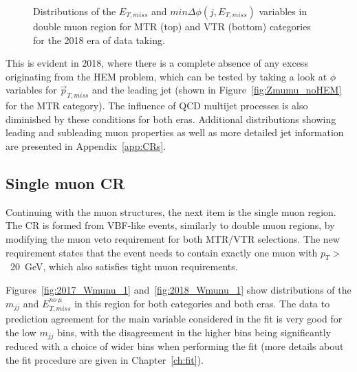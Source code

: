 \begin{figure}[htbp]
{    }
  \caption{Distributions of the $E_{T,miss}$ and $min\Delta\phi(j,E_{T,miss})$ variables in double muon region for MTR (top) and VTR (bottom) categories for the 2018 era of data taking.}
  \label{fig:2018_Zmumu_2}
\end{figure}
\hspace{10pt} This is evident in 2018, where there is a complete absence of any excess originating from the HEM problem, which can be tested by taking a look at $\phi$ variables for $\vec{p}_{T, miss}$ and the leading jet (shown in Figure~\ref{fig:Zmumu_noHEM} for the MTR category). The influence of QCD multijet processes is also diminished by these conditions for both eras. Additional distributions showing leading and subleading muon properties as well as more detailed jet information are presented in Appendix~\ref{app:CRs}.

\subsection{Single muon CR}
\label{sec:single_muon}
\hspace{10pt} Continuing with the muon structures, the next item is the single muon region. The CR is formed from VBF-like events, similarly to double muon regions, by modifying the muon veto requirement for both MTR/VTR selections. The new requirement states that the event needs to contain exactly one muon with $p_T>$~20~GeV, which also satisfies tight muon requirements.

\hspace{10pt} Figures~\ref{fig:2017_Wmunu_1} and~\ref{fig:2018_Wmunu_1} show distributions of the $m_{jj}$ and $E_{T,miss}^{no~\mu}$ in this region for both categories and both eras. The data to prediction agreement for the main variable considered in the fit is very good for the low $m_{jj}$ bins, with the disagreement in the higher bins being significantly reduced with a choice of wider bins when performing the fit (more details about the fit procedure are given in Chapter~\ref{ch:fit}).

